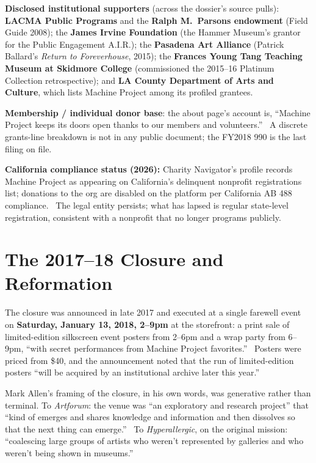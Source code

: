 \documentclass[10pt,letterpaper,twocolumn]{article}
\begin{document}
\textbf{Disclosed institutional supporters} (across the dossier's source pulls): \textbf{LACMA Public Programs} and the \textbf{Ralph M.\ Parsons endowment} (Field Guide 2008); the \textbf{James Irvine Foundation} (the Hammer Museum's grantor for the Public Engagement A.I.R.); the \textbf{Pasadena Art Alliance} (Patrick Ballard's \emph{Return to Foreverhouse}, 2015); the \textbf{Frances Young Tang Teaching Museum at Skidmore College} (commissioned the 2015--16 Platinum Collection retrospective); and \textbf{LA County Department of Arts and Culture}, which lists Machine Project among its profiled grantees.~\citep{lacmafieldguide,hammerresidency,paamachine,tangpress,laacarts}

\textbf{Membership / individual donor base}: the about page's account is, ``Machine Project keeps its doors open thanks to our members and volunteers.''~\citep{machinearchivalabout} A discrete grants-line breakdown is not in any public document; the FY2018 990 is the last filing on file.

\textbf{California compliance status (2026):} Charity Navigator's profile records Machine Project as appearing on California's delinquent nonprofit registrations list; donations to the org are disabled on the platform per California AB 488 compliance.~\citep{charitynavmachine} The legal entity persists; what has lapsed is regular state-level registration, consistent with a nonprofit that no longer programs publicly.

\section{The 2017--18 Closure and Reformation}

The closure was announced in late 2017 and executed at a single farewell event on \textbf{Saturday, January 13, 2018, 2--9pm} at the storefront: a print sale of limited-edition silkscreen event posters from 2--6pm and a wrap party from 6--9pm, ``with secret performances from Machine Project favorites.''~\citep{hyperallergicclosure,artforumclosure} Posters were priced from \$40, and the announcement noted that the run of limited-edition posters ``will be acquired by an institutional archive later this year.''~\citep{hyperallergicclosure}

Mark Allen's framing of the closure, in his own words, was generative rather than terminal. To \emph{Artforum}: the venue was ``an exploratory and research project'' that ``kind of emerges and shares knowledge and information and then dissolves so that the next thing can emerge.''~\citep{artforumclosure} To \emph{Hyperallergic}, on the original mission: ``coalescing large groups of artists who weren't represented by galleries and who weren't being shown in museums.''~\citep{hyperallergicclosure}
\end{document}
